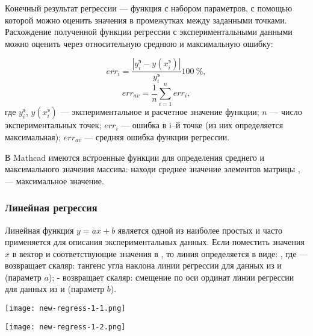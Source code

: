Конечный результат регрессии --- функция с набором параметров, с помощью которой можно оценить значения в промежутках между заданными точками. Расхождение полученной функции регрессии с экспериментальными данными можно оценить через относительную среднюю и максимальную ошибку:

\begin{equation}
err_i= \dfrac{\left| y_i^э - y(x^э_i) \right|}{y_i^э} 100\ \% ,
\end{equation}
\begin{equation}
err_{av}=\dfrac{1}{n}\sum\limits_{i=1}^{n} err_i ,
\end{equation}
где $y_i^э$, $y(x_i^э)$ --- экспериментальное и расчетное значение функции; $n$ --- число экспериментальных точек; $err_i$ --- ошибка в i–й точке (из них определяется максимальная); $err_{av}$ --- средняя ошибка функции регрессии.

В Mathcad имеются встроенные функции для определения среднего и максимального значения массива:  находи среднее значение элементов матрицы ,  --- максимальное значение.

\subsubsection{Линейная регрессия}
Линейная функция $y=ax +b $ является одной из наиболее простых и часто применяется для описания экспериментальных данных. 
Если поместить значения $x$ в вектор  и соответствующие значения  в , то линия определяется в виде:
,
где  --- возвращает скаляр: тангенс угла наклона линии регрессии для данных из  и  (параметр $a$);
 - возвращает скаляр: смещение по оси ординат линии регрессии для данных из  и  (параметр $b$).


\begin{center}
	\texttt{[image: new-regress-1-1.png]}
\end{center}
\begin{center}
	\texttt{[image: new-regress-1-2.png]}
\end{center}

